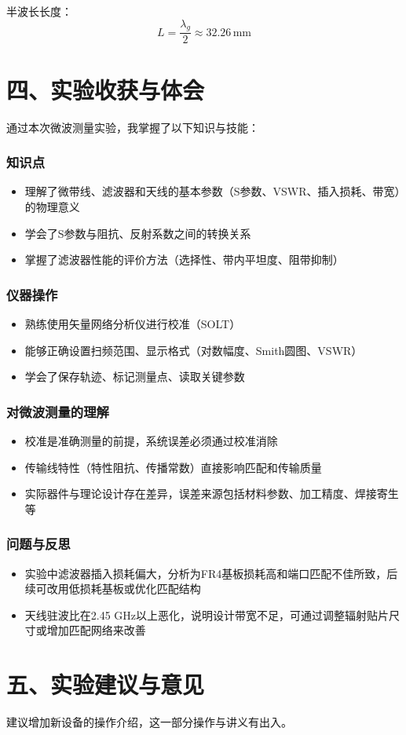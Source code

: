 \documentclass[12pt,a4paper]{article}
\begin{document}
半波长长度：
\[
L = \frac{\lambda_g}{2} \approx \boxed{32.26 \, \text{mm}}
\]


\section*{四、实验收获与体会}

通过本次微波测量实验，我掌握了以下知识与技能：

\subsubsection*{知识点}
\begin{itemize}
    \item 理解了微带线、滤波器和天线的基本参数（S参数、VSWR、插入损耗、带宽）的物理意义
    \item 学会了S参数与阻抗、反射系数之间的转换关系
    \item 掌握了滤波器性能的评价方法（选择性、带内平坦度、阻带抑制）
\end{itemize}

\subsubsection*{仪器操作}
\begin{itemize}
    \item 熟练使用矢量网络分析仪进行校准（SOLT）
    \item 能够正确设置扫频范围、显示格式（对数幅度、Smith圆图、VSWR）
    \item 学会了保存轨迹、标记测量点、读取关键参数
\end{itemize}

\subsubsection*{对微波测量的理解}
\begin{itemize}
    \item 校准是准确测量的前提，系统误差必须通过校准消除
    \item 传输线特性（特性阻抗、传播常数）直接影响匹配和传输质量
    \item 实际器件与理论设计存在差异，误差来源包括材料参数、加工精度、焊接寄生等
\end{itemize}

\subsubsection*{问题与反思}
\begin{itemize}
    \item 实验中滤波器插入损耗偏大，分析为FR4基板损耗高和端口匹配不佳所致，后续可改用低损耗基板或优化匹配结构
    \item 天线驻波比在2.45 GHz以上恶化，说明设计带宽不足，可通过调整辐射贴片尺寸或增加匹配网络来改善
\end{itemize}

\section*{五、实验建议与意见}

建议增加新设备的操作介绍，这一部分操作与讲义有出入。
\end{document}
